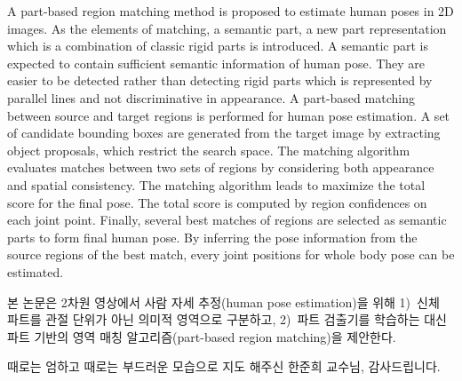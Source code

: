 \documentclass[master,english,final]{postech-ucs}
\begin{document}
A part-based region matching method is proposed to estimate human poses in 2D images. As the elements of matching, a semantic part, a new part representation which is a combination of classic rigid parts is introduced. A semantic part is expected to contain sufficient semantic information of human pose. They are easier to be detected rather than detecting rigid parts which is represented by parallel lines and not discriminative in appearance.
A part-based matching between source and target regions is performed for human pose estimation. A set of candidate bounding boxes are generated from the target image by extracting object proposals, which restrict the search space. The matching algorithm evaluates matches between two sets of regions by considering both appearance and spatial consistency. The matching algorithm leads to maximize the total score for the final pose. The total score is computed by region confidences on each joint point. Finally, several best matches of regions are selected as semantic parts to form final human pose. By inferring the pose information from the source regions of the best match, every joint positions for whole body pose can be estimated.



\begin{summarykorean}
본 논문은 2차원 영상에서 사람 자세 추정(human pose estimation)을 위해 1)~신체 파트를 관절 단위가 아닌 의미적 영역으로 구분하고, 2)~파트 검출기를 학습하는 대신 파트 기반의 영역 매칭 알고리즘(part-based region matching)을 제안한다.


\end{summarykorean}






\acknowledgement[korean]

    때로는 엄하고 때로는 부드러운 모습으로 지도 해주신 한준희 교수님, 감사드립니다.
\curriculumvitae[korean]

    \begin{personaldata}
    \end{personaldata}
\end{document}
